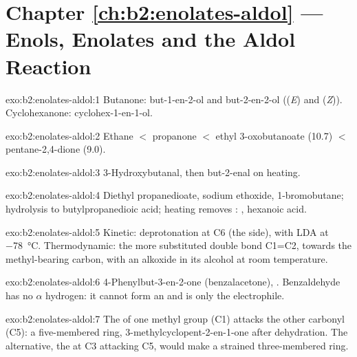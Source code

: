 \section*{Chapter \ref{ch:b2:enolates-aldol} --- Enols, Enolates and the Aldol Reaction}

\begin{solution}{exo:b2:enolates-aldol:1}
Butanone: but-1-en-2-ol  and but-2-en-2-ol  ((\textit{E}) and
(\textit{Z})). Cyclohexanone: cyclohex-1-en-1-ol.
\end{solution}

\begin{solution}{exo:b2:enolates-aldol:2}
Ethane $<$ propanone $<$ ethyl 3-oxobutanoate (10.7) $<$ pentane-2,4-dione (9.0).
\end{solution}

\begin{solution}{exo:b2:enolates-aldol:3}
3-Hydroxybutanal, then but-2-enal on heating.
\end{solution}

\begin{solution}{exo:b2:enolates-aldol:4}
Diethyl propanedioate, sodium ethoxide, 1-bromobutane; hydrolysis to butylpropanedioic acid;
heating removes : , hexanoic acid.
\end{solution}

\begin{solution}{exo:b2:enolates-aldol:5}
Kinetic: deprotonation at C6 (the  side), with LDA at \qty{-78}{\degreeCelsius}. Thermodynamic:
the more substituted double bond C1=C2, towards the methyl-bearing carbon, with an alkoxide in its
alcohol at room temperature.
\end{solution}

\begin{solution}{exo:b2:enolates-aldol:6}
4-Phenylbut-3-en-2-one (benzalacetone), . Benzaldehyde has no $\alpha$ hydrogen: it
cannot form an  and is only the electrophile.
\end{solution}

\begin{solution}{exo:b2:enolates-aldol:7}
The  of one methyl group (C1) attacks the other carbonyl (C5): a five-membered ring,
3-methylcyclopent-2-en-1-one after dehydration. The alternative, the  at C3 attacking C5,
would make a strained three-membered ring.
\end{solution}

